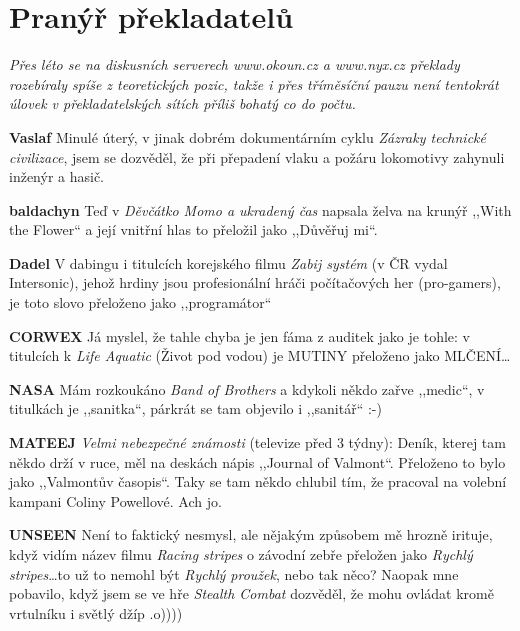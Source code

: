 \section{Pranýř překladatelů}
\noindent
\textit{Přes léto se na diskusních serverech \textit{www.okoun.cz} a \textit{www.nyx.cz} překlady rozebíraly spíše z teoretických pozic, takže i přes tříměsíční pauzu není tentokrát úlovek v překladatelských sítích příliš bohatý co do počtu.} 

\bigskip

\noindent
\textbf{Vaslaf} Minulé úterý, v jinak dobrém dokumentárním cyklu \textit{Zázraky technické civilizace}, jsem se dozvěděl, že při přepadení vlaku a požáru lokomotivy zahynuli inženýr a hasič. 

\medskip

\noindent
\textbf{baldachyn} Teď v \textit{Děvčátko Momo a ukradený čas} napsala želva na krunýř ,,With the Flower`` a její vnitřní hlas to přeložil jako ,,Důvěřuj mi``. 

\medskip

\noindent
\textbf{Dadel} V dabingu i titulcích korejského filmu \textit{Zabij systém} (v ČR vydal Intersonic), jehož hrdiny jsou profesionální hráči počítačových her (pro-gamers), je toto slovo přeloženo jako ,,programátor`` 

\medskip

\noindent
\textbf{CORWEX} Já myslel, že tahle chyba je jen fáma z auditek jako je tohle: v titulcích k \textit{Life Aquatic} (Život pod vodou) je MUTINY přeloženo jako MLČENÍ\ldots

\medskip

\noindent
\textbf{NASA} Mám rozkoukáno \textit{Band of Brothers} a kdykoli někdo zařve ,,medic``, v titulkách je ,,sanitka``, párkrát se tam objevilo i ,,sanitář`` :-)

\medskip

\noindent
\textbf{MATEEJ} \textit{Velmi nebezpečné známosti} (televize před 3 týdny): Deník, kterej tam někdo drží v ruce, měl na deskách nápis ,,Journal of Valmont``. Přeloženo to bylo jako ,,Valmontův časopis``. Taky se tam někdo chlubil tím, že pracoval na volební kampani Coliny Powellové. Ach jo.

\medskip

\noindent
\textbf{UNSEEN} Není to faktický nesmysl, ale nějakým způsobem mě hrozně irituje, když vidím název filmu \textit{Racing stripes} o závodní zebře přeložen jako \textit{Rychlý stripes}\ldots to už to nemohl být \textit{Rychlý proužek}, nebo tak něco? Naopak mne pobavilo, když jsem se ve hře \textit{Stealth Combat} dozvěděl, že mohu ovládat kromě vrtulníku i světlý džíp .o))))

